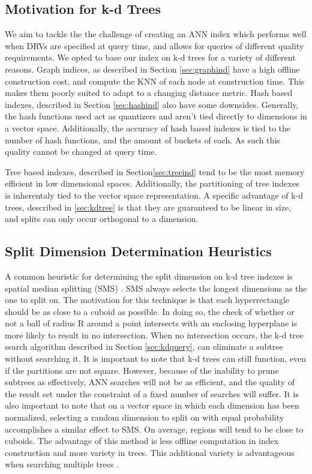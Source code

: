\subsection{Motivation for k-d Trees}

We aim to tackle the the challenge of creating an ANN index which performs well when DRVs are specified at query time, and allows for queries of different quality requirements.  We opted to base our index on k-d trees for a variety of different reasons.  Graph indices, as described in Section \ref{sec:graphind} have a high offline construction cost, and compute the KNN of each node at construction time.  This makes them poorly suited to adapt to a changing distance metric.  Hash based indexes, described in Section \ref{sec:hashind} also have some downsides.  Generally, the hash functions used act as quantizers and aren't tied directly to dimensions in a vector space.  Additionally, the accuracy of hash based indexes is tied to the number of hash functions, and the amount of buckets of each.  As such this quality cannot be changed at query time.

Tree based indexes, described in Section\ref{sec:treeind} tend to be the most memory efficient in low dimensional spaces.  Additionally, the partitioning of tree indexes is inherentaly tied to the vector space representation.  A specific advantage of k-d trees, described in \ref{sec:kdtree} is that they are guaranteed to be linear in size, and splits can only occur orthogonal to a dimension.

\subsection{Split Dimension Determination Heuristics}
\label{section:splitdim}

A common heuristic for determining the split dimension on k-d tree indexes is spatial median splitting (SMS) \citep{zhou2008real,wald2006building}.  SMS always selects the longest dimensions as the one to split on.  The motivation for this technique is that each hyperrectangle should be as close to a cuboid as possible.  In doing so, the check of whether or not a ball of radius R around a point intersects with an enclosing hyperplane is more likely to result in no intersection.  When no intersection occurs, the k-d tree search algorithm described in Section \ref{sec:kdquery}, can eliminate a subtree without searching it.  It is important to note that k-d trees can still function, even if the partitions are not square.  However, because of the inability to prune subtrees as effectively, ANN searches will not be as efficient, and the quality of the result set under the constraint of a fixed number of searches will suffer.  It is also important to note that on a vector space in which each dimension has been normalized, selecting a random dimension to split on with equal probability accomplishes a similar effect to SMS.  On average, regions will tend to be close to cuboids. The advantage of this method is less offline computation in index construction and more variety in trees.  This additional variety is advantageous when searching multiple trees \citep{flann_pami_2014}.

